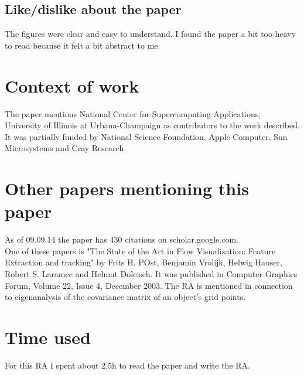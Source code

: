 \documentclass{article}
\begin{document}
\subsection*{Like/dislike about the paper}

The figures were clear and easy to understand, 
I found the paper a bit too heavy to read because it felt a bit abstract to me.

\section{Context of work}

The paper mentions National Center for Supercomputing Applications, University of Illinois at Urbana-Champaign as contributors to the work described. It was partially funded by National Science Foundation, Apple Computer, Sun Microsystems and Cray Research

\section{Other papers mentioning this paper}

As of 09.09.14 the paper has 430 citations on scholar.google.com.\\
One of these papers is "The State of the Art in Flow Visualization: Feature Extraction and tracking" by Frits H. POst, Benjamin Vrolijk, Helwig Hauser, Robert S. Laramee and Helmut Doleisch. It was published in Computer Graphics Forum, Volume 22, Issue 4, December 2003.
The RA is mentioned in connection to eigenanalysis of the covariance matrix of an object's grid points.

\section{Time used}
For this RA I spent about 2.5h to read the paper and write the RA.
\end{document}
